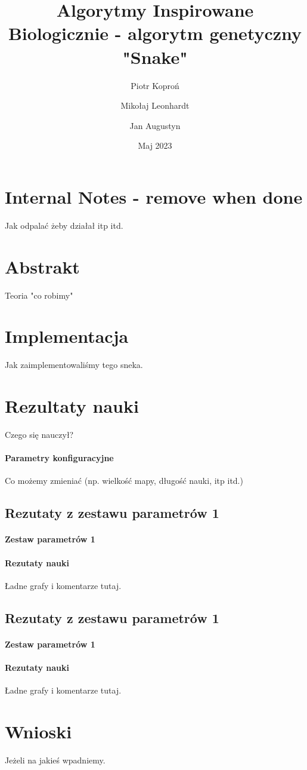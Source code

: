 \documentclass{article}
\author{Piotr Koproń \and Mikołaj Leonhardt \and Jan Augustyn}
\date{Maj 2023}
\title{Algorytmy Inspirowane Biologicznie - algorytm genetyczny "Snake"}
\begin{document}
\maketitle
\newpage
\section{Internal Notes - remove when done}
Jak odpalać żeby działał itp itd.
\section{Abstrakt}
Teoria "co robimy"
\section{Implementacja}
Jak zaimplementowaliśmy tego sneka.
\section{Rezultaty nauki}
Czego się nauczył?
\paragraph{Parametry konfiguracyjne}
Co możemy zmieniać (np. wielkość mapy, długość nauki, itp itd.)
\subsection{Rezutaty z zestawu parametrów 1}
\paragraph{Zestaw parametrów 1}
\paragraph{Rezutaty nauki}
Ładne grafy i komentarze tutaj.
\subsection{Rezutaty z zestawu parametrów 1}
\paragraph{Zestaw parametrów 1}
\paragraph{Rezutaty nauki}
Ładne grafy i komentarze tutaj.
\section{Wnioski} 
Jeżeli na jakieś wpadniemy.
\end{document}
